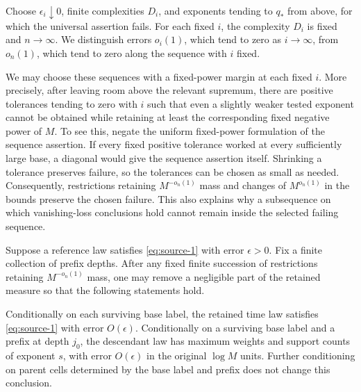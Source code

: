 Choose \(\epsilon_i\downarrow0\), finite complexities \(D_i\), and
exponents tending to \(q_*\) from above, for which the universal
assertion fails.  For each fixed \(i\), the complexity \(D_i\) is
fixed and \(n\to\infty\).  We distinguish errors \(o_i(1)\), which
tend to zero as \(i\to\infty\), from \(o_n(1)\), which tend to zero
along the sequence with \(i\) fixed.

We may choose these sequences with a fixed-power margin at each
fixed \(i\).  More precisely, after leaving room above the relevant
supremum, there are positive tolerances tending to zero with \(i\)
such that even a slightly weaker tested exponent cannot be obtained
while retaining at least the corresponding fixed negative power
of \(M\).  To see this, negate the uniform fixed-power formulation
of the sequence assertion.  If every fixed positive tolerance
worked at every sufficiently large base, a diagonal would give
the sequence assertion itself.  Shrinking a tolerance preserves
failure, so the tolerances can be chosen as small as needed.
Consequently, restrictions retaining \(M^{-o_n(1)}\) mass and changes
of \(M^{o_n(1)}\) in the bounds preserve the chosen failure.  This
also explains why a subsequence on which vanishing-loss conclusions
hold cannot remain inside the selected failing sequence.

\begin{lemma}\label{geo:time-conditioning}
Suppose a reference law satisfies \eqref{eq:source-1} with error
\(\epsilon>0\).  Fix a finite collection of prefix depths.  After
any fixed finite succession of restrictions retaining
\(M^{-o_n(1)}\) mass, one may remove a negligible part of the
retained measure so that the following statements hold.

Conditionally on each surviving base label, the retained time law
satisfies \eqref{eq:source-1} with error \(O(\epsilon)\).
Conditionally on a surviving base label and a prefix at depth
\(j_0\), the descendant law has maximum weights and support counts
of exponent \(s\), with error \(O(\epsilon)\) in the original
\(\log M\) units.  Further conditioning on parent cells determined
by the base label and prefix does not change this conclusion.
\end{lemma}

